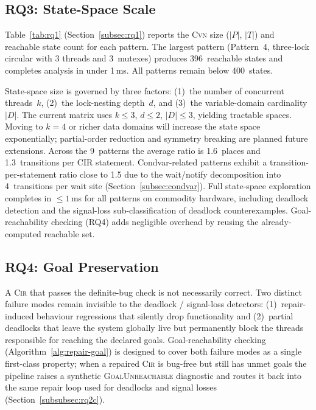 \subsection{RQ3: State-Space Scale}
\label{subsec:rq3}

Table~\ref{tab:rq1} (Section~\ref{subsec:rq1}) reports the \textsc{Cvn} size ($|P|$, $|T|$) and reachable state count for each pattern. The largest pattern (Pattern~4, three-lock circular with 3 threads and 3~mutexes) produces 396~reachable states and completes analysis in under 1\,ms. All patterns remain below 400~states.

State-space size is governed by three factors: (1)~the number of concurrent threads~$k$, (2)~the lock-nesting depth~$d$, and (3)~the variable-domain cardinality~$|D|$. The current matrix uses $k \leq 3$, $d \leq 2$, $|D| \leq 3$, yielding tractable spaces. Moving to $k=4$ or richer data domains will increase the state space exponentially; partial-order reduction and symmetry breaking are planned future extensions. Across the 9~patterns the average ratio is 1.6~places and 1.3~transitions per CIR statement. Condvar-related patterns exhibit a transition-per-statement ratio close to 1.5 due to the wait/notify decomposition into 4~transitions per \textsf{wait} site (Section~\ref{subsec:condvar}). Full state-space exploration completes in $\leq 1$\,ms for all patterns on commodity hardware, including deadlock detection and the signal-loss sub-classification of deadlock counterexamples. Goal-reachability checking (RQ4) adds negligible overhead by reusing the already-computed reachable set.


\subsection{RQ4: Goal Preservation}
\label{subsec:rq4}
A \textsc{Cir} that passes the definite-bug check is not necessarily correct. Two distinct failure modes remain invisible to the deadlock / signal-loss detectors: (1)~repair-induced behaviour regressions that silently drop functionality and (2)~partial deadlocks that leave the system globally live but permanently block the threads responsible for reaching the declared goals.
Goal-reachability checking (Algorithm~\ref{alg:repair-goal}) is designed to cover both failure modes as a single first-class property; when a repaired \textsc{Cir} is bug-free but still has unmet goals the pipeline raises a synthetic \textsc{GoalUnreachable} diagnostic and routes it back into the same repair loop used for deadlocks and signal losses (Section~\ref{subsubsec:rq2c}).

